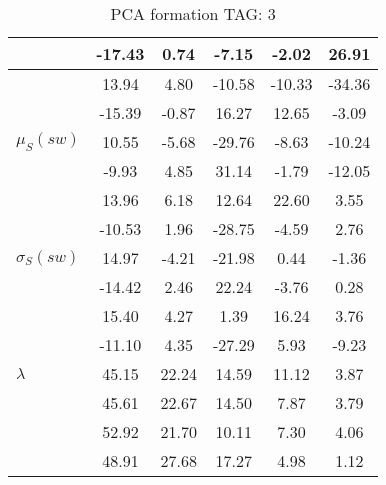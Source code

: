 \begin{table}[h!]
\begin{center}
\begin{tabular}{| l | c | c | c | c | c |}
 & -17.43  & 0.74  & -7.15  & -2.02  & 26.91 \\\hline
 & 13.94  & 4.80  & -10.58  & -10.33  & -34.36 \\\hline
 & -15.39  & -0.87  & 16.27  & 12.65  & -3.09 \\\hline
$\mu_S(sw)$ & 10.55  & -5.68  & -29.76  & -8.63  & -10.24 \\\hline
 & -9.93  & 4.85  & 31.14  & -1.79  & -12.05 \\\hline
 & 13.96  & 6.18  & 12.64  & 22.60  & 3.55 \\\hline
 & -10.53  & 1.96  & -28.75  & -4.59  & 2.76 \\\hline
$\sigma_S(sw)$ & 14.97  & -4.21  & -21.98  & 0.44  & -1.36 \\\hline
 & -14.42  & 2.46  & 22.24  & -3.76  & 0.28 \\\hline
 & 15.40  & 4.27  & 1.39  & 16.24  & 3.76 \\\hline
 & -11.10  & 4.35  & -27.29  & 5.93  & -9.23 \\\hline
$\lambda$ & 45.15  & 22.24  & 14.59  & 11.12  & 3.87 \\\hline
 & 45.61  & 22.67  & 14.50  & 7.87  & 3.79 \\\hline
 & 52.92  & 21.70  & 10.11  & 7.30  & 4.06 \\\hline
 & 48.91  & 27.68  & 17.27  & 4.98  & 1.12 \\\hline
\end{tabular}
\caption{PCA formation TAG: 3}
\end{center}
\end{table}